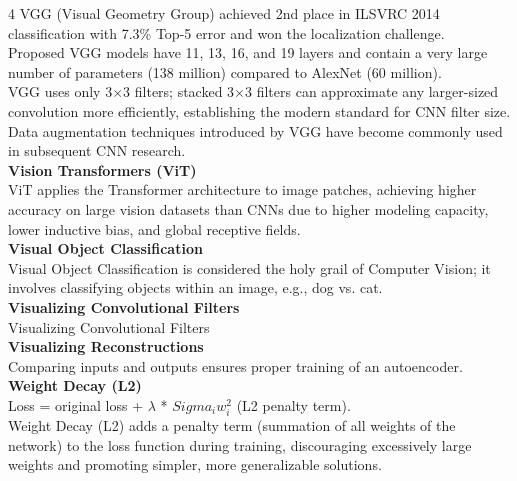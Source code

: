 \documentclass[8pt]{extarticle}
\begin{document}
\begin{multicols}{4}
VGG (Visual Geometry Group) achieved 2nd place in ILSVRC 2014 classification with 7.3\% Top-5 error and won the localization challenge.\\
Proposed VGG models have 11, 13, 16, and 19 layers and contain a very large number of parameters (138 million) compared to AlexNet (60 million).\\
VGG uses only 3$\times$3 filters; stacked 3$\times$3 filters can approximate any larger-sized convolution more efficiently, establishing the modern standard for CNN filter size.\\
Data augmentation techniques introduced by VGG have become commonly used in subsequent CNN research.\\
\vspace{2pt}\textbf{Vision Transformers (ViT)}\\
ViT applies the Transformer architecture to image patches, achieving higher accuracy on large vision datasets than CNNs due to higher modeling capacity, lower inductive bias, and global receptive fields.\\
\vspace{2pt}\textbf{Visual Object Classification}\\
Visual Object Classification is considered the holy grail of Computer Vision; it involves classifying objects within an image, e.g., dog vs. cat.\\
\vspace{2pt}\textbf{Visualizing Convolutional Filters}\\
Visualizing Convolutional Filters\\
\vspace{2pt}\textbf{Visualizing Reconstructions}\\
Comparing inputs and outputs ensures proper training of an autoencoder.\\
\vspace{2pt}\textbf{Weight Decay (L2)}\\
Loss = original loss + $\lambda$ * $ Sigma_{i} w_{i}^{2}$ (L2 penalty term).\\
Weight Decay (L2) adds a penalty term (summation of all weights of the network) to the loss function during training, discouraging excessively large weights and promoting simpler, more generalizable solutions.\\


\end{multicols}
\end{document}
